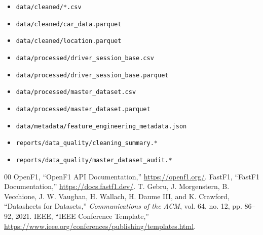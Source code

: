 \documentclass[conference]{IEEEtran}
\begin{document}
\begin{itemize}
    \item \texttt{data/cleaned/*.csv}
    \item \texttt{data/cleaned/car\_data.parquet}
    \item \texttt{data/cleaned/location.parquet}
    \item \texttt{data/processed/driver\_session\_base.csv}
    \item \texttt{data/processed/driver\_session\_base.parquet}
    \item \texttt{data/processed/master\_dataset.csv}
    \item \texttt{data/processed/master\_dataset.parquet}
    \item \texttt{data/metadata/feature\_engineering\_metadata.json}
    \item \texttt{reports/data\_quality/cleaning\_summary.*}
    \item \texttt{reports/data\_quality/master\_dataset\_audit.*}
\end{itemize}

\begin{thebibliography}{00}
 OpenF1, ``OpenF1 API Documentation,'' \url{https://openf1.org/}.
 FastF1, ``FastF1 Documentation,'' \url{https://docs.fastf1.dev/}.
 T. Gebru, J. Morgenstern, B. Vecchione, J. W. Vaughan, H. Wallach, H. Daume III, and K. Crawford, ``Datasheets for Datasets,'' \emph{Communications of the ACM}, vol. 64, no. 12, pp. 86--92, 2021.
 IEEE, ``IEEE Conference Template,'' \url{https://www.ieee.org/conferences/publishing/templates.html}.
\end{thebibliography}
\end{document}

